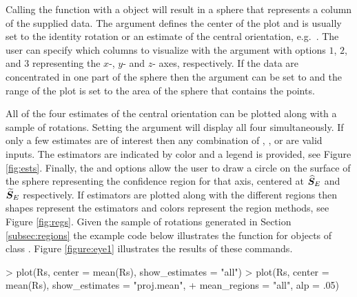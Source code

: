Calling the  function with a  object will result in a sphere that represents a column of the supplied data.  The  argument defines the center of the plot and is usually set to the identity rotation  or an estimate of the central orientation, e.g.~.  The user can specify which columns to visualize with the  argument with options $1$, $2$, and $3$ representing the $x$-, $y$- and $z$- axes, respectively.  If the data are concentrated in one part of the sphere then the  argument can be set to  and the range of the plot is set to the area of the sphere that contains the points. 

All of the four estimates of the central orientation can be plotted along with a sample of rotations. Setting the argument  will display all four simultaneously.  If only a few estimates are of interest then any combination of , ,  or  are valid inputs.  The estimators are indicated by color and a legend is provided, see Figure \ref{fig:ests}. Finally, the  and  options allow the user to draw a circle on the surface of the sphere representing the confidence region for that axis, centered at $\widehat{\bm S}_E$ and $\widetilde{\bm S}_E$ respectively.  If estimators are plotted along with the different regions then shapes represent the estimators and colors represent the region methods, see Figure \ref{fig:regs}.  Given the sample of rotations generated in Section \ref{subsec:regions} the example code below illustrates the  function for objects of class .  Figure \ref{figure:eye1} illustrates the results of these commands.

\begin{example}
> plot(Rs, center = mean(Rs), show_estimates = "all")
> plot(Rs, center = mean(Rs), show_estimates = "proj.mean", 
+ mean_regions = "all",  alp = .05)
\end{example}


